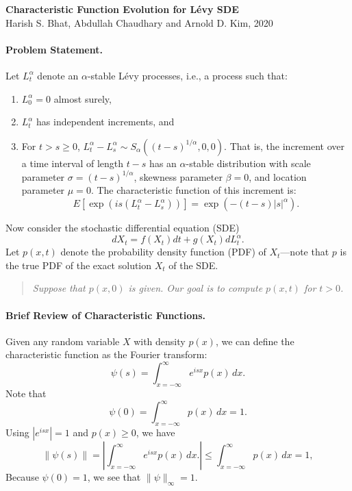 \documentclass[11pt,letterpaper]{article}
\begin{document}
\begin{center}
\textbf{Characteristic Function Evolution for L\'{e}vy SDE}\\
Harish S. Bhat, Abdullah Chaudhary and Arnold D. Kim, 2020
\end{center}

\paragraph{Problem Statement.} Let $L_t^{\alpha}$ denote an $\alpha$-stable L\'{e}vy processes, i.e., a process such that:
\begin{enumerate}
\item $L_0^\alpha = 0$ almost surely,
\item $L_t^\alpha$ has independent increments, and
\item For $t > s \geq 0$, $L_t^\alpha - L_s^\alpha \sim S_\alpha((t-s)^{1/\alpha},0,0)$.  That is, the increment over a time interval of length $t-s$ has an $\alpha$-stable distribution with scale parameter $\sigma = (t-s)^{1/\alpha}$, skewness parameter $\beta=0$, and location parameter $\mu=0$.  The characteristic function of this increment is:
\begin{equation}
\label{eqn:cfinc}
E[\exp(i s (L_t^\alpha - L_s^\alpha))] = \exp(-(t-s) |s|^\alpha).
\end{equation}
\end{enumerate}

\noindent Now consider the stochastic differential equation (SDE)
\begin{equation}
\label{eqn:sde}
dX_t = f(X_t) dt + g(X_t) dL_t^{\alpha}.
\end{equation}
Let $p(x,t)$ denote the probability density function (PDF) of $X_t$---note that $p$ is the true PDF of the exact solution $X_t$ of the SDE.

\begin{quote}
\emph{Suppose that $p(x,0)$ is given.  Our goal is to compute $p(x,t)$ for $t > 0$.}
\end{quote}

\paragraph{Brief Review of Characteristic Functions.} Given any random variable $X$ with density $p(x)$, we can define the characteristic function as the Fourier transform:
\[
\psi(s) = \int_{x=-\infty}^\infty e^{i s x} p(x) \, dx.
\]
Note that
\[
\psi(0) = \int_{x=-\infty}^\infty p(x) \, dx = 1.
\]
Using $|e^{i s x}| = 1$ and $p(x) \geq 0$, we have
\[
\| \psi(s) \| = \left| \int_{x=-\infty}^\infty e^{i s x} p(x) \, dx. \right| \leq \int_{x=-\infty}^\infty p(x) \, dx = 1,
\]
Because $\psi(0) = 1$, we see that $\|\psi \|_\infty = 1$.
\end{document}
